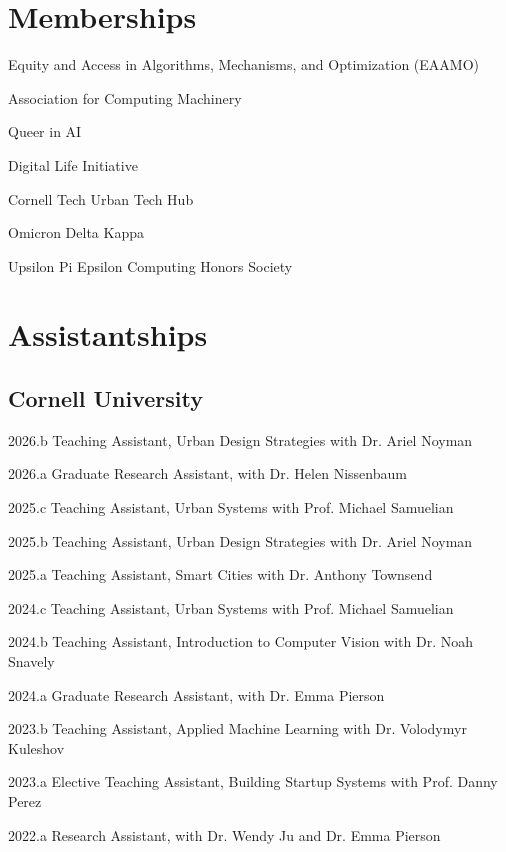\documentclass[10pt,letterpaper]{report}
\newcommand{\listitemspace}{0.25em}
\renewenvironment{itemize}
{\begin{list}{}{\setlength{\leftmargin}{0em}
                \setlength{\parskip}{0em}
                \setlength{\itemsep}{\listitemspace}
                \setlength{\parsep}{\listitemspace}}}
{\end{list}}
\begin{document}
    \section*{Memberships}

    \begin{itemize}
        \item Equity and Access in Algorithms, Mechanisms, and Optimization (EAAMO)
        \item Association for Computing Machinery 
        \item Queer in AI
        \item Digital Life Initiative 
        \item Cornell Tech Urban Tech Hub
        \item Omicron Delta Kappa 
        \item Upsilon Pi Epsilon Computing Honors Society 

    \end{itemize}
    
    \section*{Assistantships}

    \subsection*{Cornell University}
    \begin{tablist} 
        \item[2026.b] Teaching Assistant, Urban Design Strategies with Dr. Ariel Noyman
        \item[2026.a] Graduate Research Assistant, with Dr. Helen Nissenbaum
        \item[2025.c] Teaching Assistant, Urban Systems with Prof. Michael Samuelian
        \item[2025.b] Teaching Assistant, Urban Design Strategies with Dr. Ariel Noyman
        \item[2025.a] Teaching Assistant, Smart Cities with Dr. Anthony Townsend 
        \item[2024.c] Teaching Assistant, Urban Systems with Prof. Michael Samuelian 
        \item[2024.b] Teaching Assistant, Introduction to Computer Vision with Dr. Noah Snavely 
        \item[2024.a] Graduate Research Assistant, with Dr. Emma Pierson 
        \item[2023.b] Teaching Assistant, Applied Machine Learning with Dr. Volodymyr Kuleshov
        \item[2023.a] Elective Teaching Assistant, Building Startup Systems with Prof. Danny Perez 
        \item[2022.a] Research Assistant, with Dr. Wendy Ju and Dr. Emma Pierson
    \end{tablist} 
\end{document}
